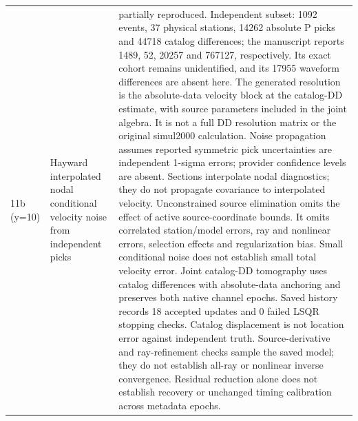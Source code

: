 \begin{longtable}{>{\raggedright\arraybackslash}p{}>{\raggedright\arraybackslash}p{}>{\raggedright\arraybackslash}p{}}
11b (y=10) & Hayward interpolated nodal conditional velocity noise from independent picks & partially reproduced. Independent subset: 1092 events, 37 physical stations, 14262 absolute P picks and 44718 catalog differences; the manuscript reports 1489, 52, 20257 and 767127, respectively. Its exact cohort remains unidentified, and its 17955 waveform differences are absent here. The generated resolution is the absolute-data velocity block at the catalog-DD estimate, with source parameters included in the joint algebra. It is not a full DD resolution matrix or the original simul2000 calculation. Noise propagation assumes reported symmetric pick uncertainties are independent 1-sigma errors; provider confidence levels are absent. Sections interpolate nodal diagnostics; they do not propagate covariance to interpolated velocity. Unconstrained source elimination omits the effect of active source-coordinate bounds. It omits correlated station/model errors, ray and nonlinear errors, selection effects and regularization bias. Small conditional noise does not establish small total velocity error. Joint catalog-DD tomography uses catalog differences with absolute-data anchoring and preserves both native channel epochs. Saved history records 18 accepted updates and 0 failed LSQR stopping checks. Catalog displacement is not location error against independent truth. Source-derivative and ray-refinement checks sample the saved model; they do not establish all-ray or nonlinear inverse convergence. Residual reduction alone does not establish recovery or unchanged timing calibration across metadata epochs.\\

\end{longtable}
